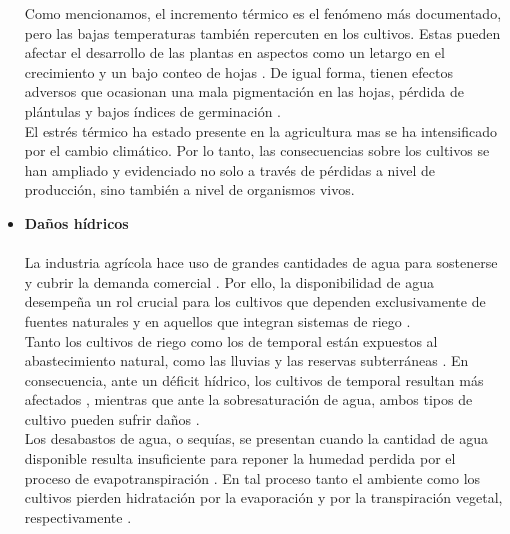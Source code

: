 \begin{itemize}[leftmargin=0cm, itemsep=0.5 cm]
Como mencionamos, el incremento térmico es el fenómeno más documentado, pero las bajas temperaturas también repercuten en los cultivos. Estas pueden afectar el desarrollo de las plantas en aspectos como un letargo en el crecimiento y un bajo conteo de hojas \cite{Ngoune_2020}. De igual forma, tienen efectos adversos que ocasionan una mala pigmentación en las hojas, pérdida de plántulas y bajos índices de germinación \cite{Zhang_2020}.\\

El estrés térmico ha estado presente en la agricultura mas se ha intensificado por el cambio climático. Por lo tanto, las consecuencias sobre los cultivos se han ampliado y evidenciado no solo a través de pérdidas a nivel de producción, sino también a nivel de organismos vivos.










\item[]\textbf{Daños hídricos\\}\\

La industria agrícola hace uso de grandes cantidades de agua para sostenerse y cubrir la demanda comercial \cite{Li_2022}. Por ello, la disponibilidad de agua desempeña un rol crucial para los cultivos que dependen exclusivamente de fuentes naturales y en aquellos que integran sistemas de riego \cite{Rockstrom_2010}.\\

Tanto los cultivos de riego como los de temporal están expuestos al abastecimiento natural, como las lluvias y las reservas subterráneas \cite{Rockstrom_2010}. En consecuencia, ante un déficit hídrico, los cultivos de temporal resultan más afectados \cite{Chen_2025}, mientras que ante la sobresaturación de agua, ambos tipos de cultivo pueden sufrir daños \cite{VanderMolen_2007}.\\

Los desabastos de agua, o sequías, se presentan cuando la cantidad de agua disponible resulta insuficiente para reponer la humedad perdida por el proceso de evapotranspiración \cite{Kumaraswamy_2016}. En tal proceso  tanto el ambiente como los cultivos pierden hidratación por la evaporación y por la transpiración vegetal, respectivamente \cite{Katul_2012}.\\


\end{itemize}
